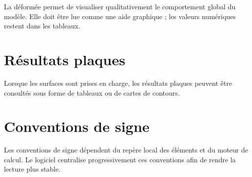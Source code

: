 La déformée permet de visualiser qualitativement le comportement global du
modèle. Elle doit être lue comme une aide graphique ; les valeurs numériques
restent dans les tableaux.

\section{Résultats plaques}

Lorsque les surfaces sont prises en charge, les résultats plaques peuvent être
consultés sous forme de tableaux ou de cartes de contours.

\section{Conventions de signe}

Les conventions de signe dépendent du repère local des éléments et du moteur de
calcul. Le logiciel centralise progressivement ces conventions afin de rendre la
lecture plus stable.


